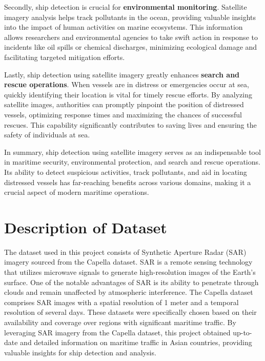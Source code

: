 \begin{sloppypar}
Secondly, ship detection is crucial for \textbf{environmental monitoring}. Satellite imagery analysis helps track pollutants in the ocean, providing valuable insights into the impact of human activities on marine ecosystems. This information allows researchers and environmental agencies to take swift action in response to incidents like oil spills or chemical discharges, minimizing ecological damage and facilitating targeted mitigation efforts.

Lastly, ship detection using satellite imagery greatly enhances \textbf{search and rescue operations}. When vessels are in distress or emergencies occur at sea, quickly identifying their location is vital for timely rescue efforts. By analyzing satellite images, authorities can promptly pinpoint the position of distressed vessels, optimizing response times and maximizing the chances of successful rescues. This capability significantly contributes to saving lives and ensuring the safety of individuals at sea.

In summary, ship detection using satellite imagery serves as an indispensable tool in maritime security, environmental protection, and search and rescue operations. Its ability to detect suspicious activities, track pollutants, and aid in locating distressed vessels has far-reaching benefits across various domains, making it a crucial aspect of modern maritime operations.

\newpage
\section{Description of Dataset}
The dataset used in this project consists of Synthetic Aperture Radar (SAR) imagery sourced from the Capella dataset. SAR is a remote sensing technology that utilizes microwave signals to generate high-resolution images of the Earth's surface. One of the notable advantages of SAR is its ability to penetrate through clouds and remain unaffected by atmospheric interference. The Capella dataset comprises SAR images with a spatial resolution of 1 meter and a temporal resolution of several days. These datasets were specifically chosen based on their availability and coverage over regions with significant maritime traffic. By leveraging SAR imagery from the Capella dataset, this project obtained up-to-date and detailed information on maritime traffic in Asian countries, providing valuable insights for ship detection and analysis.


\end{sloppypar}
